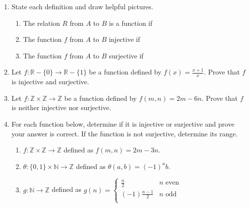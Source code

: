 \documentclass[12pt]{article}
\newcommand{\N}{\mathbb{N}}
\newcommand{\Z}{\mathbb{Z}}
\newcommand{\R}{\mathbb{R}}
\begin{document}
\begin{enumerate}
\item State each definition and draw helpful pictures.
	\begin{enumerate}
	\item The relation $R$ from $A$ to $B$ is a function if\\
	\item The function $f$ from $A$ to $B$ injective if \\
	\item The function $f$ from $A$ to $B$ surjective if \\
	\end{enumerate}
\item Let $f: \R-\{0\} \to \R -\{1\}$ be a function defined by $f(x)=\frac{x+1}{x}.$ Prove that $f$ is injective and surjective.
\vfill
\item Let $f:\Z \times \Z \to \Z$ be a function defined by $f(m,n)=2m-6n.$ Prove that $f$ is neither injective nor surjective.
\vfill
\newpage
\item For each function below, determine if it is injective or surjective and prove your answer is correct. If the function is not surjective, determine its range.
	\begin{enumerate}
	\item  $f:\Z \times \Z \to \Z$ defined as $f(m,n)=2m-3n.$
	\vfill
	\item $\theta: \{0,1\} \times \N \to \Z$ defined as $\theta(a,b)=(-1)^ab.$
	\vfill
	\item $g: \N \to \Z$ defined as $g(n)=\begin{cases} \frac{n}{2} & n \text{ even} \\
	(-1)\frac{n-1}{2} & n \text{ odd} \\
	\end{cases}$
	
	\vfill
	\end{enumerate} 
\end{enumerate}
\end{document}
